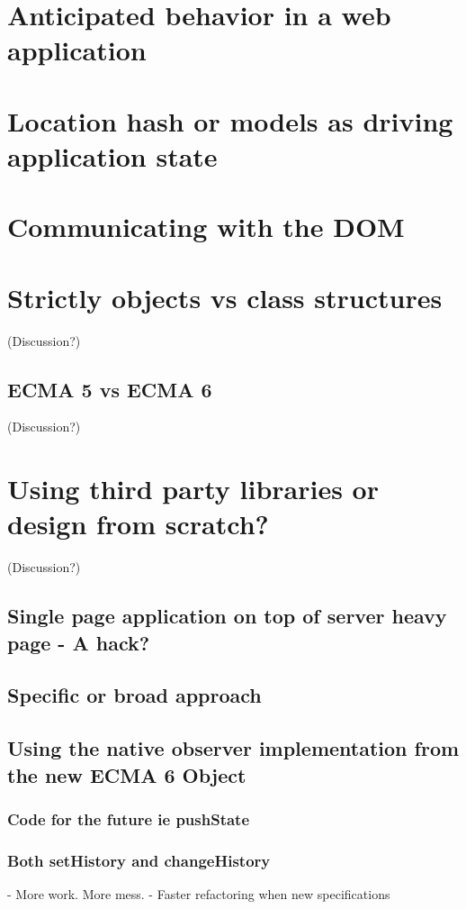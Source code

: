 \documentclass[english]{ifimaster}
\begin{document}
\section{Anticipated behavior in a web application}
\section{Location hash or models as driving application state}

\section{Communicating with the DOM}

\section{Strictly objects vs class structures} (Discussion?)
\subsection{ECMA 5 vs ECMA 6} (Discussion?)

\section{Using third party libraries or design from scratch?} (Discussion?)

\subsection{Single page application on top of server heavy page - A hack?}
\subsection{Specific or broad approach}
\subsection{Using the native observer implementation from the new ECMA 6 Object}
\subsubsection{Code for the future ie pushState} 
\subsubsection{Both setHistory and changeHistory} 
 - More work. More mess.
 - Faster refactoring when new specifications
\end{document}
